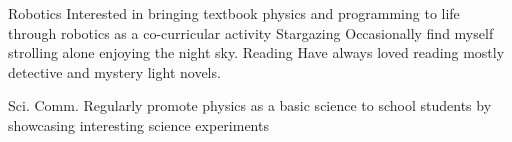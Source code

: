 

\begin{cvskills}
\cvskill
	{Robotics} %
	{Interested in bringing textbook physics and programming to life through robotics as a co-curricular activity} %
\cvskill
    {Stargazing} %
    {Occasionally find myself strolling alone enjoying the night sky.} %
\cvskill
{Reading} %
{Have always loved reading mostly detective and mystery light novels.} %

\cvskill
{Sci. Comm.}
{Regularly promote physics as a basic science to school students by showcasing interesting science experiments}

\end{cvskills}
